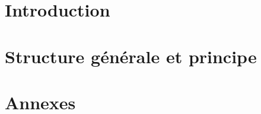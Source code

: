 \documentclass[french]{layout/Report}
\begin{document}


\newpage

\newpage\null\thispagestyle{empty}\newpage

\tableofcontents

\newpage

\section{Introduction}

\newpage
\section{Structure générale et principe}

\newpage
\vfill
\pagebreak

\section{Annexes}
\end{document}
